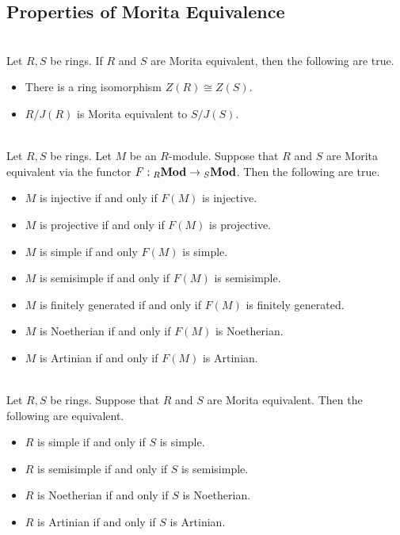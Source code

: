 \documentclass[a4paper]{article}
\begin{document}
\subsection{Properties of Morita Equivalence}
\begin{prp}{}{}\\
Let $R,S$ be rings. If $R$ and $S$ are Morita equivalent, then the following are true. 
\begin{itemize}
\item There is a ring isomorphism $Z(R)\cong Z(S)$. 
\item $R/J(R)$ is Morita equivalent to $S/J(S)$. 
\end{itemize}
\end{prp}

\begin{prp}{}{}\\
Let $R,S$ be rings. Let $M$ be an $R$-module. Suppose that $R$ and $S$ are Morita equivalent via the functor $F:{_R}\bold{Mod}\to{_S}\bold{Mod}$. Then the following are true. 
\begin{itemize}
\item $M$ is injective if and only if $F(M)$ is injective. 
\item $M$ is projective if and only if $F(M)$ is projective. 
\item $M$ is simple if and only $F(M)$ is simple. 
\item $M$ is semisimple if and only if $F(M)$ is semisimple. 
\item $M$ is finitely generated if and only if $F(M)$ is finitely generated. 
\item $M$ is Noetherian if and only if $F(M)$ is Noetherian. 
\item $M$ is Artinian if and only if $F(M)$ is Artinian. 
\end{itemize}
\end{prp}

\begin{prp}{}{}\\
Let $R,S$ be rings. Suppose that $R$ and $S$ are Morita equivalent. Then the following are equivalent. 
\begin{itemize}
\item $R$ is simple if and only if $S$ is simple. 
\item $R$ is semisimple if and only if $S$ is semisimple. 
\item $R$ is Noetherian if and only if $S$ is Noetherian. 
\item $R$ is Artinian if and only if $S$ is Artinian. 
\end{itemize}
\end{prp}
\end{document}
